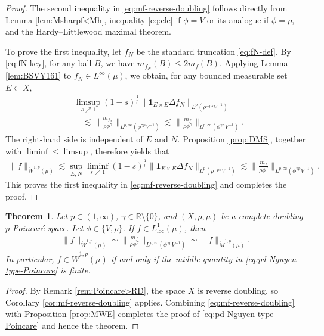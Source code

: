 \documentclass[11pt]{amsart}
\newtheorem{theorem}{Theorem}[section]
\theoremstyle{definition}
\theoremstyle{remark}
\numberwithin{equation}{section}
\newcommand{\Norm}[2]{\|#1\|_{#2}}
\begin{document}
\begin{proof}
The second inequality in \eqref{eq:mf-reverse-doubling} follows directly from
Lemma \ref{lem:Msharpf<Mh}, inequality \eqref{eq:ele} if $\phi=V$ or its
analogue if $\phi=\rho$, and the Hardy--Littlewood maximal theorem.

To prove the first inequality, let $f_N$ be the standard truncation
\eqref{eq:fN-def}. By \eqref{eq:fN-key}, for any ball $B$, we have
$ m_{f_N}(B)\le 2m_f(B).$
Applying Lemma \ref{lem:BSVY161} to $f_N\in L^\infty(\mu)$, we obtain, for
any bounded measurable set $E\subset X$,
\begin{align*}
 &\limsup_{s\nearrow 1}(1-s)^{\frac1p}
 \Norm{\mathbf{1}_{E\times E}\Delta f_N}{L^p(\rho^{-ps}V^{-1})} \\
 &\quad\lesssim
 \Big\|\frac{m_{f_N}}{\rho\phi^\gamma}\Big\|_
 {L^{p,\infty}(\phi^{\gamma p}V^{-1})}
 \lesssim
 \Big\|\frac{m_f}{\rho\phi^\gamma}\Big\|_
 {L^{p,\infty}(\phi^{\gamma p}V^{-1})}.
\end{align*}
The right-hand side is independent of $E$ and $N$. Proposition
\ref{prop:DMS}, together with $\liminf\leq\limsup$, therefore yields that
\begin{align*}
 \Norm{f}{\dot W^{1,p}(\mu)}
 \lesssim\sup_{E,N}\liminf_{s\nearrow 1}(1-s)^{\frac1p}
 \Norm{\mathbf{1}_{E\times E}\Delta f_N}{L^p(\rho^{-ps}V^{-1})}
 \lesssim
 \Big\|\frac{m_f}{\rho\phi^\gamma}\Big\|_
 {L^{p,\infty}(\phi^{\gamma p}V^{-1})}.
\end{align*}
This proves the first inequality in \eqref{eq:mf-reverse-doubling} and
completes the proof.
\end{proof}

\begin{theorem}\label{thm:pd-Nguyen-type}
Let $p\in(1,\infty)$, $\gamma\in\mathbb{R}\setminus\{0\}$,
and $(X,\rho,\mu)$ be a complete doubling $p$-Poincar\'e space. Let
$\phi\in\{V,\rho\}$. If $f\in L^1_{\mathrm{loc}}(\mu)$, then
\begin{align}\label{eq:pd-Nguyen-type-Poincare}
 \Norm{f}{\dot W^{1,p}(\mu)}
 \sim\Big\|\frac{m_f}{\rho \phi^\gamma}\Big\|_{L^{p,\infty}(\phi^{\gamma p}V^{-1})}
 \sim\Norm{f}{\dot M^{1,p}(\mu)}.
\end{align}
In particular, $f\in\dot W^{1,p}(\mu)$ if and only if the middle
quantity in \eqref{eq:pd-Nguyen-type-Poincare} is finite.
\end{theorem}

\begin{proof}
By Remark \ref{rem:Poincare>RD}, the space $X$ is reverse doubling, so Corollary
\ref{cor:mf-reverse-doubling} applies. Combining
\eqref{eq:mf-reverse-doubling} with Proposition \ref{prop:MWE} completes the
proof of \eqref{eq:pd-Nguyen-type-Poincare} and hence the theorem.
\end{proof}
\end{document}
